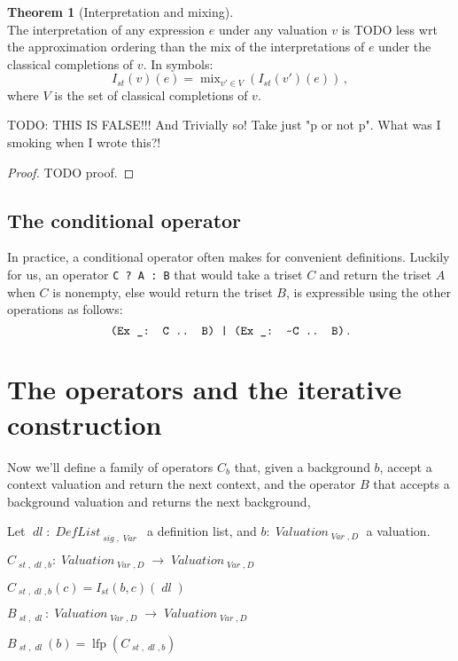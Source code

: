 \documentclass[oneside,12pt]{book}
\theoremstyle{definition}
\newtheorem{theorem}{Theorem}[section]
\theoremstyle{remark}
\newcommand{\tde}{\raisebox{0.5ex}{\texttildelow}}
\newcommand\var[1]{\mathop{\mathit{#1}}\nolimits}
\newcommand{\sig}{\var{sig}}
\newcommand{\st}{\var{st}}
\newcommand{\Var}{\var{Var}}
\DeclareMathOperator{\lfp}{lfp}
\newcommand{\Valuation}{\var{Valuation}}
\newcommand{\DefList}{\var{DefList}}
\newcommand{\dl}{\var{dl}}
\DeclareMathOperator{\mix}{mix}
\begin{document}
\begin{theorem} [Interpretation and mixing] \hfill \\
  The interpretation of any expression $e$ under any valuation $v$ is
  TODO less wrt the approximation ordering than
  the mix
  of the interpretations of $e$ under the classical completions of $v$.
  In symbols: \[I_{\st}(v)(e) = \mix_{v' \in V}(I_{\st}(v')(e))\,,\]
  where $V$ is the set of classical completions of $v$.
  
  TODO: THIS IS FALSE!!! And Trivially so! Take just "p or not p". What
  was I smoking when I wrote this?!
\end{theorem}

\begin{proof}
  TODO proof.
\end{proof}

\subsection{The conditional operator}
In practice, a conditional operator often makes for convenient definitions.
Luckily for us, an operator \texttt{C ? A : B} that would take a triset $C$
and return the triset $A$ when $C$ is nonempty, else would return the triset $B$,
is expressible using the other operations as follows:
\[\texttt{(Ex \_: C .. B) | (Ex \_: \tde C .. B)}\,.\]

\section{The operators and the iterative construction}
Now we'll define a family of operators $C_{b}$ that, given a background $b$,
accept a context valuation and return the next context, and the operator $B$ that
accepts a background valuation and returns the next background,

\begin{defBox}
  Let $\dl\colon \DefList_{\sig,\Var}$ a definition list, and
  $b\colon \Valuation_{\Var,D}$ a valuation.
  
  \medskip \noindent $C_{\st,\dl,b}
    \colon \Valuation_{\Var,D} \to \Valuation_{\Var,D}$
  
  \nopagebreak \smallskip \noindent $C_{\st,\dl,b}(c) = I_{\st}(b,c)(\dl)$
  
  \bigskip \noindent $B_{\st,\dl}
    \colon \Valuation_{\Var,D} \to \Valuation_{\Var,D}$
  
  \nopagebreak \smallskip \noindent $B_{\st,\dl}(b) = \lfp(C_{\st,\dl,b})$
\end{defBox}
\end{document}
